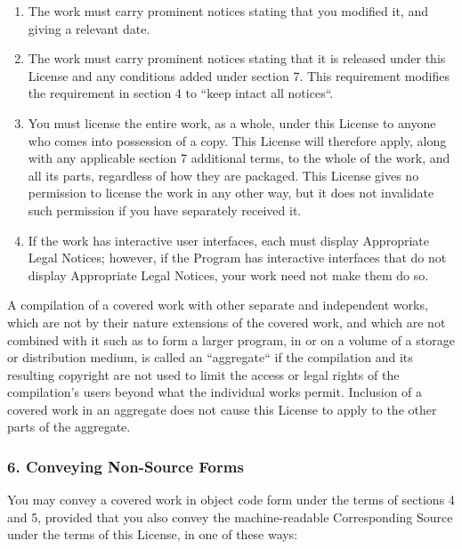 \documentclass[a4paper, 11pt, twoside]{article}
\begin{document}
\begin{enumerate}[label=\Alph*)]
\item The work must carry prominent notices stating that you modified it, and giving a relevant date.
\item The work must carry prominent notices stating that it is released under this License and any conditions added under section 7. This requirement modifies the requirement in section 4 to “keep intact all notices“.
\item You must license the entire work, as a whole, under this License to anyone who comes into possession of a copy. This License will therefore apply, along with any applicable section 7 additional terms, to the whole of the work, and all its parts, regardless of how they are packaged. This License gives no permission to license the work in any other way, but it does not invalidate such permission if you have separately received it.
\item If the work has interactive user interfaces, each must display Appropriate Legal Notices; however, if the Program has interactive interfaces that do not display Appropriate Legal Notices, your work need not make them do so.
\end{enumerate}

A compilation of a covered work with other separate and independent works, which are not by their nature extensions of the covered work, and which are not combined with it such as to form a larger program, in or on a volume of a storage or distribution medium, is called an “aggregate“ if the compilation and its resulting copyright are not used to limit the access or legal rights of the compilation's users beyond what the individual works permit. Inclusion of a covered work in an aggregate does not cause this License to apply to the other parts of the aggregate.

\subsubsection{6. Conveying Non-Source Forms}

You may convey a covered work in object code form under the terms of sections 4 and 5, provided that you also convey the machine-readable Corresponding Source under the terms of this License, in one of these ways:
\end{document}
